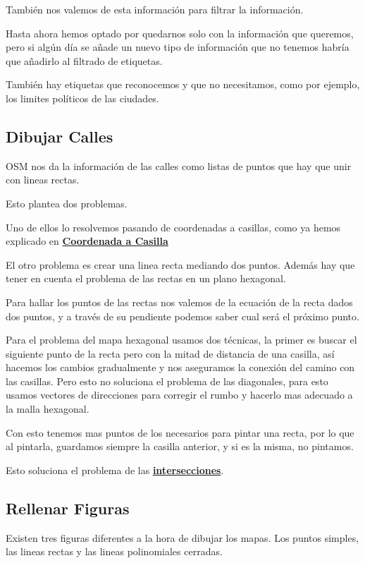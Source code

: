 También nos valemos de esta información para filtrar la información.

Hasta ahora hemos optado por quedarnos solo con la información que queremos,
pero si algún día se añade un nuevo tipo de información que no tenemos habría
que añadirlo al filtrado de etiquetas.

También hay etiquetas que reconocemos y que no necesitamos, como por ejemplo,
los limites políticos de las ciudades.

\subsection*{Dibujar Calles}
OSM nos da la información de las calles como listas de puntos que hay que unir
con lineas rectas.

Esto plantea dos problemas.

Uno de ellos lo resolvemos pasando de coordenadas a casillas, como ya hemos
explicado en \hyperref[coordToTile]{\bf Coordenada a Casilla}

El otro problema es crear una linea recta mediando dos puntos.
Además hay que tener en cuenta el problema de las rectas en un plano hexagonal.

Para hallar los puntos de las rectas nos valemos de la ecuación de la recta
dados dos puntos, y a través de su pendiente podemos saber cual será el próximo
punto.

Para el problema del mapa hexagonal usamos dos técnicas, la primer es buscar el
siguiente punto de la recta pero con la mitad de distancia de una casilla, así
hacemos los cambios gradualmente y nos aseguramos la conexión del camino con
las casillas.
Pero esto no soluciona el problema de las diagonales, para esto usamos vectores
de direcciones para corregir el rumbo y hacerlo mas adecuado a la malla
hexagonal.

Con esto tenemos mas puntos de los necesarios para pintar una recta, por lo que
al pintarla, guardamos siempre la casilla anterior, y si es la misma, no
pintamos. 

Esto soluciona el problema de las \hyperref[Intersecciones]
{\bf intersecciones}.
\subsection*{Rellenar Figuras}
Existen tres figuras diferentes a la hora de dibujar los mapas.
Los puntos simples, las lineas rectas y las lineas polinomiales cerradas.

